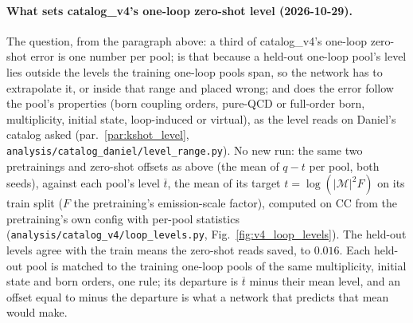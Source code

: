 \documentclass[11pt]{article}
\newcommand{\code}[1]{\texttt{#1}}
\begin{document}
\paragraph{What sets catalog\_v4's one-loop zero-shot level (2026-10-29).}\label{par:v4_loop_levels} The question, from
the paragraph above: a third of catalog\_v4's one-loop zero-shot error is one number per pool; is that because a
held-out one-loop pool's level lies outside the levels the training one-loop pools span, so the network has to
extrapolate it, or inside that range and placed wrong; and does the error follow the pool's properties (born coupling
orders, pure-QCD or full-order born, multiplicity, initial state, loop-induced or virtual), as the level reads on
Daniel's catalog asked (par.~\ref{par:kshot_level}, \code{analysis/catalog\_daniel/level\_range.py}). No new run: the
same two pretrainings and zero-shot offsets as above (the mean of $q-t$ per pool, both seeds), against each pool's level
$\overline t$, the mean of its target $t=\log(|\mathcal M|^2F)$ on its train split ($F$ the pretraining's
emission-scale factor), computed on CC from the pretraining's own config with per-pool statistics
(\code{analysis/catalog\_v4/loop\_levels.py}, Fig.~\ref{fig:v4_loop_levels}). The held-out levels agree with the train
means the zero-shot reads saved, to $0.016$. Each held-out pool is matched to the training one-loop pools of the same
multiplicity, initial state and born orders, one rule; its departure is $\overline t$ minus their mean level, and an
offset equal to minus the departure is what a network that predicts that mean would make.
\end{document}
